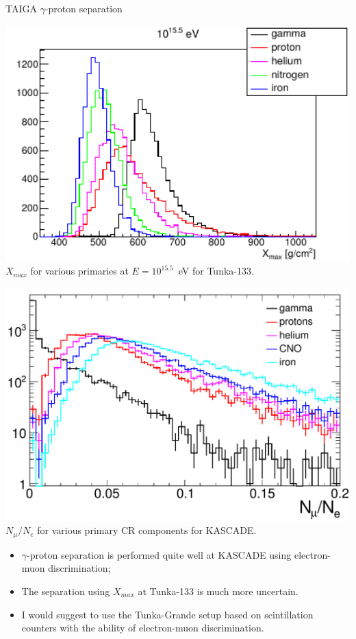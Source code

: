 \begin{frame}{TAIGA $\gamma$-proton separation}
\begin{minipage}[c]{0.49\textwidth}
  \begin{center}
    \includegraphics[width=1\textwidth]{pics/tunka_gamma_cr_diff.pdf}\\\small
    $X_{max}$ for various primaries at $E = 10^{15.5}$~eV for Tunka-133.
  \end{center}
\end{minipage}
\hfill
\begin{minipage}[c]{0.49\textwidth}
  \begin{center}
    \includegraphics[width=1\textwidth]{pics/Nmu_Ne.pdf}\\\small
    $N_\mu / N_e$ for various primary CR components for KASCADE.
  \end{center}
\end{minipage}
\vspace{1ex}\small
\begin{itemize}
\setlength{\itemsep}{0pt}
\setlength{\parsep}{0pt}
\setlength{\parskip}{0pt}
  \item $\gamma$-proton separation is performed quite well at KASCADE using electron-muon discrimination;
  \item The separation using $X_{max}$ at Tunka-133 is much more uncertain.
  \item I would suggest to use the Tunka-Grande setup based on scintillation counters with the ability of electron-muon discrimination.
\end{itemize}
\end{frame}
